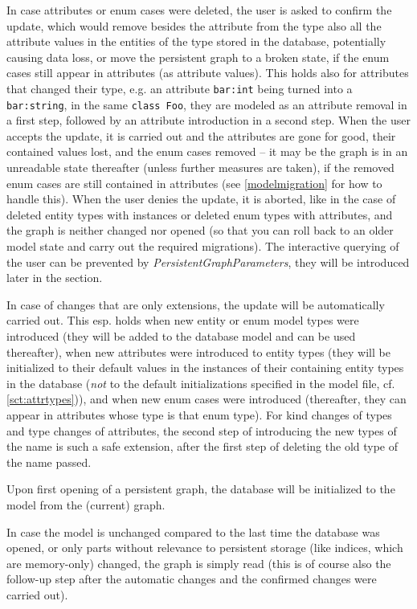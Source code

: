 In case attributes or enum cases were deleted, the user is asked to confirm the update, which would remove besides the attribute from the type also all the attribute values in the entities of the type stored in the database, potentially causing data loss, or move the persistent graph to a broken state, if the enum cases still appear in attributes (as attribute values).
This holds also for attributes that changed their type, e.g. an attribute \texttt{bar:int} being turned into a \texttt{bar:string}, in the same \texttt{class Foo}, they are modeled as an attribute removal in a first step, followed by an attribute introduction in a second step.
When the user accepts the update, it is carried out and the attributes are gone for good, their contained values lost, and the enum cases removed -- it may be the graph is in an unreadable state thereafter (unless further measures are taken), if the removed enum cases are still contained in attributes (see \ref{modelmigration} for how to handle this).
When the user denies the update, it is aborted, like in the case of deleted entity types with instances or deleted enum types with attributes, and the graph is neither changed nor opened (so that you can roll back to an older model state and carry out the required migrations).
The interactive querying of the user can be prevented by \emph{PersistentGraphParameters}, they will be introduced later in the section.

In case of changes that are only extensions, the update will be automatically carried out.
This esp. holds when new entity or enum model types were introduced
(they will be added to the database model and can be used thereafter),
when new attributes were introduced to entity types
(they will be initialized to their \GrG{ } default values in the instances of their containing entity types in the database (\emph{not} to the default initializations specified in the \GrG{ } model file, cf. \ref{sct:attrtypes})),
and when new enum cases were introduced (thereafter, they can appear in attributes whose type is that enum type).
For kind changes of types and type changes of attributes, 
the second step of introducing the new types of the name is such a safe extension,
after the first step of deleting the old type of the name passed.

Upon first opening of a persistent graph, the database will be initialized to the model from the (current) graph.

In case the model is unchanged compared to the last time the database was opened, or only parts without relevance to persistent storage (like indices, which are memory-only) changed, the graph is simply read (this is of course also the follow-up step after the automatic changes and the confirmed changes were carried out).

